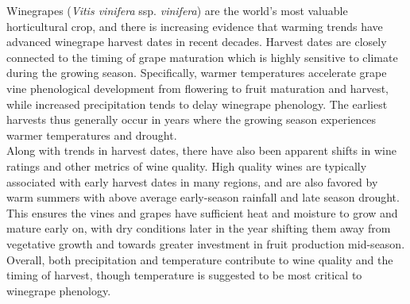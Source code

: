 \documentclass[final]{nature}
\begin{document}
\noindent Winegrapes (\emph{Vitis vinifera} ssp. \emph{vinifera}) are the world's most valuable horticultural crop, and there is increasing evidence that warming trends have advanced winegrape harvest dates in recent decades\cite{Duchene:2005bd,Jones:2000br,schultzjones,Seguin2005,tomasi2011,odo2012,webb2012}. Harvest dates are closely connected to the timing of grape maturation which is highly sensitive to climate during the growing season. Specifically, warmer temperatures accelerate grape vine phenological development from flowering to fruit maturation and harvest, while increased precipitation tends to delay winegrape phenology\cite{jones2013}. The earliest harvests thus generally occur in years where the growing season experiences warmer temperatures and drought\cite{Jones:2000br}.\\
\indent Along with trends in harvest dates, there have also been apparent shifts in wine ratings\cite{jones2005} and other metrics of wine quality\cite{Jones:2000br,mori2007}. High quality wines are typically associated with early harvest dates in many regions\cite{Jones:2000br,jones2005}, and are also favored by warm summers with above average early-season rainfall and late season drought. This ensures the vines and grapes have sufficient heat and moisture to grow and mature early on, with dry conditions later in the year shifting them away from vegetative growth and towards greater investment in fruit production mid-season\cite{chaves2010,jones2013,baciocco2014}. Overall, both precipitation\cite{vanlee2009} and temperature\cite{baciocco2014} contribute to wine quality and the timing of harvest\cite{odo2012,webb2012}, though temperature is suggested to be most critical to winegrape phenology\cite{coombe1987,jones2005}.\\
\end{document}
